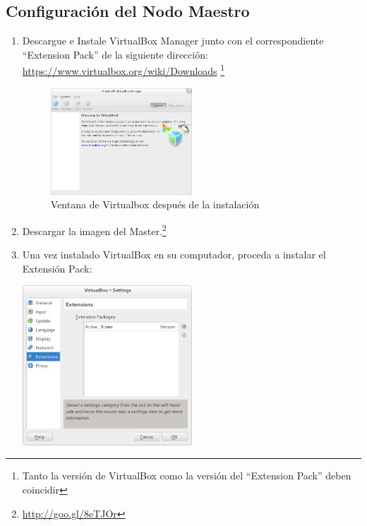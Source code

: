 \subsection{Configuración del Nodo Maestro}
\begin{enumerate}

\item Descargue e Instale VirtualBox Manager junto con el correspondiente ``Extension Pack'' de la siguiente dirección: \url{https://www.virtualbox.org/wiki/Downloads} \footnote{Tanto la versión de VirtualBox como la versión del ``Extension Pack'' deben coincidir}

	\begin{figure}[H]
		\centering
		\includegraphics[width=0.5\textwidth]{aux/vb_instalado}
		\caption{Ventana de Virtualbox después de la instalación}
		\label{vb_instalado}
	\end{figure}


\item Descargar la imagen del Master.\footnote{\url{http://goo.gl/8eTJOr}}



\item Una vez instalado VirtualBox en su computador, proceda a instalar el Extensión Pack: 

	\includegraphics[width=0.5\textwidth]{aux/sinextensionpack}
	
\begin{itemize}



\end{itemize}
\end{enumerate}
